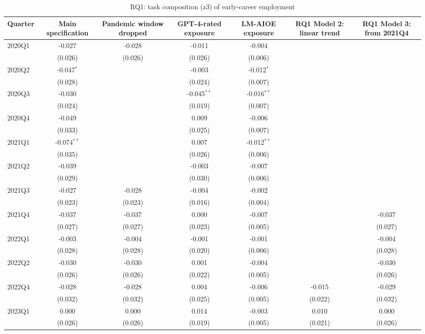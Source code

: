 \begin{table}[htbp]\centering
\caption{RQ1: task composition (z3) of early-career employment}
\begin{tabular}{lcccccc}
\toprule
Quarter & Main specification & Pandemic window dropped & GPT-4-rated exposure & LM-AIOE exposure & RQ1 Model 2: linear trend & RQ1 Model 3: from 2021Q4 \\
\midrule
2020Q1 & -0.027 & -0.028 & -0.011 & -0.004 &  &  \\
 & (0.026) & (0.026) & (0.026) & (0.006) &  &  \\
2020Q2 & -0.047$^{*}$ &  & -0.003 & -0.012$^{*}$ &  &  \\
 & (0.028) &  & (0.024) & (0.007) &  &  \\
2020Q3 & -0.030 &  & -0.045$^{**}$ & -0.016$^{**}$ &  &  \\
 & (0.024) &  & (0.019) & (0.007) &  &  \\
2020Q4 & -0.049 &  & 0.009 & -0.006 &  &  \\
 & (0.033) &  & (0.025) & (0.007) &  &  \\
2021Q1 & -0.074$^{**}$ &  & 0.007 & -0.012$^{**}$ &  &  \\
 & (0.035) &  & (0.026) & (0.006) &  &  \\
2021Q2 & -0.039 &  & -0.003 & -0.007 &  &  \\
 & (0.029) &  & (0.030) & (0.006) &  &  \\
2021Q3 & -0.027 & -0.028 & -0.004 & -0.002 &  &  \\
 & (0.023) & (0.023) & (0.016) & (0.004) &  &  \\
2021Q4 & -0.037 & -0.037 & 0.000 & -0.007 &  & -0.037 \\
 & (0.027) & (0.027) & (0.023) & (0.005) &  & (0.027) \\
2022Q1 & -0.003 & -0.004 & -0.001 & -0.001 &  & -0.004 \\
 & (0.028) & (0.028) & (0.020) & (0.006) &  & (0.028) \\
2022Q2 & -0.030 & -0.030 & 0.001 & -0.004 &  & -0.030 \\
 & (0.026) & (0.026) & (0.022) & (0.005) &  & (0.026) \\
2022Q4 & -0.028 & -0.028 & 0.004 & -0.006 & -0.015 & -0.029 \\
 & (0.032) & (0.032) & (0.025) & (0.005) & (0.022) & (0.032) \\
2023Q1 & 0.000 & 0.000 & 0.014 & -0.003 & 0.010 & 0.000 \\
 & (0.026) & (0.026) & (0.019) & (0.005) & (0.021) & (0.026) \\

\end{tabular}
\end{table}

